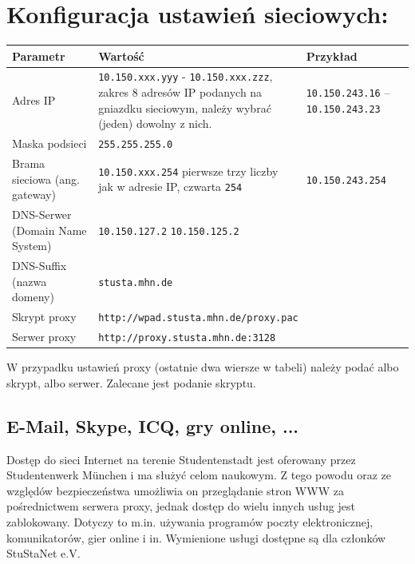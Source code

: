 \documentclass[a4paper,12pt]{scrartcl}
\begin{document}
\section*{Konfiguracja ustawień sieciowych:}

\begin{center}
  \begin{tabularx}{\linewidth}{|lXp{.2\linewidth}|}
    \hline
    Parametr & Wartość & Przykład \\
    \hline \hline
    Adres IP & \nolinkurl{10.150.xxx.yyy} -
    \nolinkurl{10.150.xxx.zzz}, \newline zakres 8 adresów IP podanych
    na gniazdku sieciowym, należy wybrać (jeden) dowolny z nich. & \nolinkurl{10.150.243.16} – \nolinkurl{10.150.243.23} \\
    \hline
    Maska podsieci & \nolinkurl{255.255.255.0} & \\
    \hline
    Brama sieciowa (ang. gateway) & \nolinkurl{10.150.xxx.254} \newline pierwsze trzy liczby jak w adresie IP, czwarta \nolinkurl{254} & \nolinkurl{10.150.243.254} \\
    \hline
    DNS-Serwer (Domain Name System) & \nolinkurl{10.150.127.2} \newline \nolinkurl{10.150.125.2} & \\
    \hline
    DNS-Suffix (nazwa domeny) & \nolinkurl{stusta.mhn.de} & \\
    \hline
    Skrypt proxy & \multicolumn{2}{l|}{\nolinkurl{http://wpad.stusta.mhn.de/proxy.pac}} \\
    \hline
    Serwer proxy & \multicolumn{2}{l|}{\nolinkurl{http://proxy.stusta.mhn.de:3128}} \\
    \hline
  \end{tabularx}
\end{center}

W przypadku ustawień proxy (ostatnie dwa wiersze w tabeli) należy podać albo skrypt, albo serwer. Zalecane jest podanie skryptu.

\subsection*{E-Mail, Skype, ICQ, gry online, ...}

Dostęp do sieci Internet na terenie Studentenstadt jest oferowany przez Studentenwerk München i ma służyć celom naukowym. Z tego powodu oraz ze względów bezpieczeństwa umożliwia on przeglądanie stron WWW za pośrednictwem serwera proxy, jednak dostęp do wielu innych usług jest zablokowany. Dotyczy to m.in. używania programów poczty elektronicznej, komunikatorów, gier online i in. Wymienione usługi dostępne są dla członków StuStaNet e.V.
\end{document}
